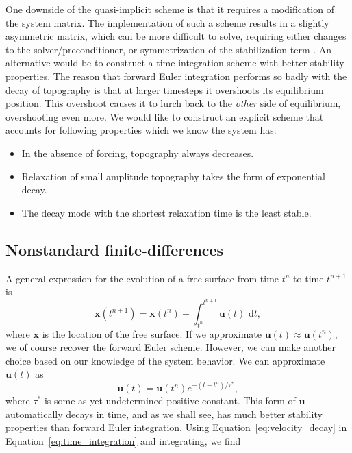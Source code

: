 \documentclass[preprint,12pt,authoryear]{elsarticle}
\begin{document}
One downside of the quasi-implicit scheme is that it requires a modification of the system matrix.
The implementation of such a scheme results in a slightly 
asymmetric matrix, which can be more difficult to solve, requiring either
changes to the solver/preconditioner, or symmetrization of the stabilization term \citep{kaus2010stabilization}.
An alternative would be to construct a time-integration scheme with better stability properties.  
The reason that forward Euler integration performs so badly with the decay of topography is that 
at larger timesteps it overshoots its equilibrium position. This overshoot causes it to lurch back 
to the \emph{other} side of equilibrium, overshooting even more.
We would like to construct an explicit scheme that accounts for following properties which we know the system has:
\begin{itemize}
\item In the absence of forcing, topography always decreases.
\item Relaxation of small amplitude topography takes the form of exponential decay.
\item The decay mode with the shortest relaxation time is the least stable.
\end{itemize}

\subsection{Nonstandard finite-differences}

A general expression for the evolution of a free surface from time $t^n$ to time $t^{n+1}$ is 
\begin{equation}
\mathbf{x}(t^{n+1}) = \mathbf{x}(t^n) + \int_{t^{n}}^{t^{n+1}} \mathbf{u}(t) \text{ d}t,
\label{eq:time_integration}
\end{equation}
where $\mathbf{x}$ is the location of the free surface.  If we approximate $\mathbf{u}(t) \approx \mathbf{u}(t^{n})$, 
we of course recover the forward Euler scheme.
However, we can make another choice based on our knowledge of the system behavior. 
We can approximate $\mathbf{u}(t)$ as
\begin{equation}
\mathbf{u}(t) = \mathbf{u}(t^n) e^{-(t-t^n)/\tau^*},
\label{eq:velocity_decay}
\end{equation}
where $\tau^*$ is some as-yet undetermined positive constant.
This form of $\mathbf{u}$ automatically decays in time, and as we shall see, has much better 
stability properties than forward Euler integration.
Using Equation~\eqref{eq:velocity_decay} in Equation~\eqref{eq:time_integration} and integrating, we find
\end{document}
